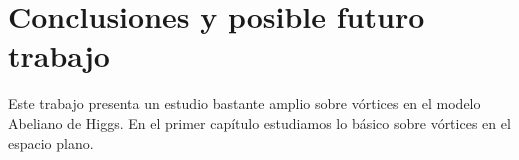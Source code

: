 
\chapter{Conclusiones y posible futuro trabajo}

\label{ch:conclusiones}

Este trabajo presenta un estudio bastante amplio sobre vórtices en el modelo Abeliano de Higgs. En el primer capítulo estudiamos lo básico sobre vórtices en el espacio plano.
